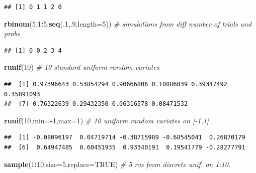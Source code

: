 \documentclass[]{article}
\newenvironment{Shaded}{\begin{snugshade}}{\end{snugshade}}
\newcommand{\KeywordTok}[1]{\textcolor[rgb]{0.13,0.29,0.53}{\textbf{#1}}}
\newcommand{\DataTypeTok}[1]{\textcolor[rgb]{0.13,0.29,0.53}{#1}}
\newcommand{\DecValTok}[1]{\textcolor[rgb]{0.00,0.00,0.81}{#1}}
\newcommand{\CommentTok}[1]{\textcolor[rgb]{0.56,0.35,0.01}{\textit{#1}}}
\newcommand{\OtherTok}[1]{\textcolor[rgb]{0.56,0.35,0.01}{#1}}
\newcommand{\OperatorTok}[1]{\textcolor[rgb]{0.81,0.36,0.00}{\textbf{#1}}}
\newcommand{\NormalTok}[1]{#1}
\begin{document}
\begin{verbatim}
## [1] 0 1 1 2 0
\end{verbatim}

\begin{Shaded}
\begin{Highlighting}[]
\KeywordTok{rbinom}\NormalTok{(}\DecValTok{5}\NormalTok{,}\DecValTok{1}\OperatorTok{:}\DecValTok{5}\NormalTok{,}\KeywordTok{seq}\NormalTok{(.}\DecValTok{1}\NormalTok{,.}\DecValTok{9}\NormalTok{,}\DataTypeTok{length=}\DecValTok{5}\NormalTok{))   }\CommentTok{# simulations from diff number of trials and probs}
\end{Highlighting}
\end{Shaded}

\begin{verbatim}
## [1] 0 0 2 3 4
\end{verbatim}

\begin{Shaded}
\begin{Highlighting}[]
\KeywordTok{runif}\NormalTok{(}\DecValTok{10}\NormalTok{)                }\CommentTok{# 10 standard uniform random variates}
\end{Highlighting}
\end{Shaded}

\begin{verbatim}
##  [1] 0.97396643 0.53854294 0.90666806 0.10886039 0.39347492 0.35891093
##  [7] 0.76322639 0.29432350 0.06316578 0.08471532
\end{verbatim}

\begin{Shaded}
\begin{Highlighting}[]
\KeywordTok{runif}\NormalTok{(}\DecValTok{10}\NormalTok{,}\DataTypeTok{min=}\OperatorTok{-}\DecValTok{1}\NormalTok{,}\DataTypeTok{max=}\DecValTok{1}\NormalTok{)        }\CommentTok{# 10 uniform random variates on [-1,1]}
\end{Highlighting}
\end{Shaded}

\begin{verbatim}
##  [1] -0.08096197  0.04719714 -0.38715989 -0.68545041  0.26870179
##  [6]  0.64947485  0.60451935  0.93340191  0.19541779 -0.28277791
\end{verbatim}

\begin{Shaded}
\begin{Highlighting}[]
\KeywordTok{sample}\NormalTok{(}\DecValTok{1}\OperatorTok{:}\DecValTok{10}\NormalTok{,}\DataTypeTok{size=}\DecValTok{5}\NormalTok{,}\DataTypeTok{replace=}\OtherTok{TRUE}\NormalTok{)        }\CommentTok{# 5 rvs from discrete unif. on 1:10.}
\end{Highlighting}
\end{Shaded}
\end{document}
